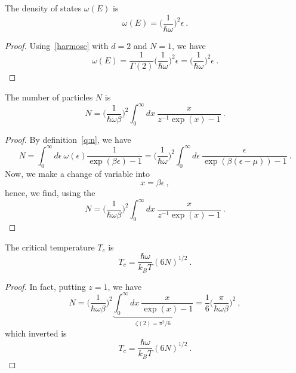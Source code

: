     The density of states $\omega(E)$ is 
    \begin{equation*}
        \omega(E) = \Big (\frac{1}{\hbar \omega} \Big )^{2} \epsilon ~.
    \end{equation*}
    \begin{proof}
        Using~\eqref{harmosc} with $d = 2$ and $N = 1$, we have
        \begin{equation}
            \omega(E) = \frac{1}{\Gamma (2)} \Big (\frac{1}{\hbar \omega} \Big )^{2} \epsilon = \Big (\frac{1}{\hbar \omega} \Big )^{2} \epsilon ~.
        \end{equation}
    \end{proof}

    The number of particles $N$ is 
    \begin{equation*}
        N = \Big (\frac{1}{\hbar \omega \beta} \Big )^{2} \int_0^\infty d x ~ \frac{x}{z^{-1} \exp (x) - 1} ~.
    \end{equation*}
    \begin{proof}
        By definition~\eqref{q:n}, we have 
        \begin{equation}
            N = \int_0^\infty d\epsilon ~ \omega(\epsilon) \frac{1}{\exp(\beta \epsilon) - 1} = \Big (\frac{1}{\hbar \omega} \Big )^{2} \int_0^\infty d\epsilon ~ \frac{\epsilon}{\exp(\beta (\epsilon - \mu)) - 1} ~.
        \end{equation}
        Now, we make a change of variable into 
        \begin{equation}
            x = \beta \epsilon ~, 
        \end{equation}
        hence, we find, using the 
        \begin{equation*}
            N = \Big (\frac{1}{\hbar \omega \beta} \Big )^{2} \int_0^\infty d x ~ \frac{x}{z^{-1} \exp (x) - 1} ~.
        \end{equation*}
    \end{proof}

    The critical temperature $T_c$ is 
    \begin{equation*}
            T_c = \frac{\hbar \omega}{k_B T} (6N)^{1/2} ~.
    \end{equation*}
    \begin{proof}
        In fact, putting $z = 1$, we have 
        \begin{equation}
            N = \Big (\frac{1}{\hbar \omega \beta} \Big )^{2} \underbrace{\int_0^\infty d x ~ \frac{x}{\exp (x) - 1} }_{\zeta(2) = \pi^2 / 6} = \frac{1}{6} \Big (\frac{\pi}{\hbar \omega \beta} \Big )^{2} ~,
        \end{equation}
        which inverted is 
        \begin{equation}
            T_c = \frac{\hbar \omega}{k_B T} (6N)^{1/2} ~.
        \end{equation}
    \end{proof}

